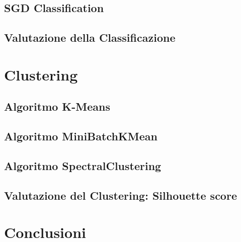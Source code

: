 \documentclass[12pt,oneside]{article}
\begin{document}
    \begin{enumerate}
    \subsection{SGD Classification}
    \end{enumerate}
    
    \begin{enumerate}
    \subsection{Valutazione della Classificazione}
    \end{enumerate}


\section{Clustering}
    \begin{enumerate}
    \subsection{Algoritmo K-Means}
    \end{enumerate}

    \begin{enumerate}
    \subsection{Algoritmo MiniBatchKMean}
    \end{enumerate}

    \begin{enumerate}
    \subsection{Algoritmo SpectralClustering}
    \end{enumerate}

    \begin{enumerate}
    \subsection{Valutazione del Clustering: Silhouette score}
    \end{enumerate}

\section{Conclusioni}

    
\end{document}
